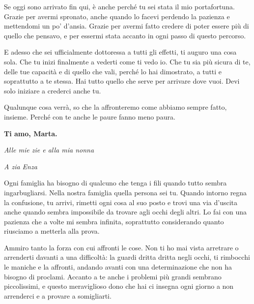 Se oggi sono arrivato fin qui, è anche perché tu sei stata il mio portafortuna. Grazie per avermi spronato, anche quando lo facevi perdendo la pazienza e mettendomi un po' d'ansia. Grazie per avermi fatto credere di poter essere più di quello che pensavo, e per essermi stata accanto in ogni passo di questo percorso.\par

\vspace{5mm}

E adesso che sei ufficialmente dottoressa a tutti gli effetti, ti auguro una cosa sola. Che tu inizi finalmente a vederti come ti vedo io. Che tu sia più sicura di te, delle tue capacità e di quello che vali, perché lo hai dimostrato, a tutti e soprattutto a te stessa. Hai tutto quello che serve per arrivare dove vuoi. Devi solo iniziare a crederci anche tu.\par

\vspace{5mm}

Qualunque cosa verrà, so che la affronteremo come abbiamo sempre fatto, insieme. Perché con te anche le paure fanno meno paura.\par

\vspace{5mm}

\begin{center}
    \textbf{Ti amo, Marta.}
\end{center}

\clearpage
\vspace{10mm}
\begin{center}
    \textit{Alle mie zie e alla mia nonna}
\end{center}
\vspace{5mm}

\vspace{5mm}
\textit{A zia Enza}\par
\vspace{2mm}
Ogni famiglia ha bisogno di qualcuno che tenga i fili quando tutto sembra ingarbugliarsi. Nella nostra famiglia quella persona sei tu. Quando intorno regna la confusione, tu arrivi, rimetti ogni cosa al suo posto e trovi una via d'uscita anche quando sembra impossibile da trovare agli occhi degli altri. Lo fai con una pazienza che a volte mi sembra infinita, soprattutto considerando quanto riusciamo a metterla alla prova.\par

Ammiro tanto la forza con cui affronti le cose. Non ti ho mai vista arretrare o arrenderti davanti a una difficoltà: la guardi dritta dritta negli occhi, ti rimbocchi le maniche e la affronti, andando avanti con una determinazione che non ha bisogno di proclami. Accanto a te anche i problemi più grandi sembrano piccolissimi, e questo meraviglioso dono che hai ci insegna ogni giorno a non arrenderci e a provare a somigliarti.\par

